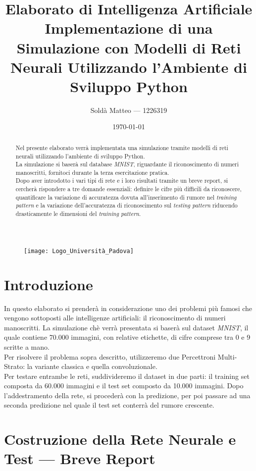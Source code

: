 \documentclass[12pt, a4paper]{article}
\title{\textbf{Elaborato di Intelligenza Artificiale} \\ Implementazione di una Simulazione con Modelli di Reti Neurali Utilizzando l'Ambiente di Sviluppo Python}
\author{Soldà Matteo --- 1226319}
\date{\today}
\begin{document}
\begin{figure}
    \centering
    \texttt{[image: Logo\_Università\_Padova]}
\end{figure}

\maketitle

\newpage
\begin{abstract}
Nel presente elaborato verrà implementata una simulazione tramite modelli di reti neurali utilizzando l'ambiente di sviluppo Python.\\
La simulazione si baserà sul database \textit{MNIST}, riguardante il riconoscimento di numeri manoscritti, fornitoci durante la terza esercitazione pratica.\\
Dopo aver introdotto i vari tipi di rete e i loro risultati tramite un breve report, si cercherà rispondere a tre domande essenziali: definire le cifre più difficili da riconoscere, quantificare la variazione di accuratezza dovuta all'inserimento di rumore nel \textit{training pattern} e la variazione dell'accuratezza di riconoscimento sul \textit{testing pattern} riducendo drasticamente le dimensioni del \textit{training pattern}.    
\end{abstract}

\newpage
\tableofcontents

\newpage
\section{Introduzione}
In questo elaborato si prenderà in considerazione uno dei problemi più famosi che vengono sottoposti alle intelligenze artificiali: il riconoscimento di numeri manoscritti.
La simulazione chè verrà presentata si baserà sul dataset \textit{MNIST}, il quale contiene 70.000 immagini, con relative etichette, di cifre comprese tra 0 e 9 scritte a mano.\\
Per risolvere il problema sopra descritto, utilizzeremo due Percettroni Multi-Strato: la variante classica e quella convoluzionale.\\
Per testare entrambe le reti, suddivideremo il dataset in due parti: il training set composta da 60.000 immagini e il test set composto da 10.000 immagini. Dopo l'addestramento della rete, si procederà con la predizione, per poi passare ad una seconda predizione nel quale il test set conterrà del rumore crescente.

\newpage
\section{Costruzione della Rete Neurale e Test --- Breve Report}
\end{document}
